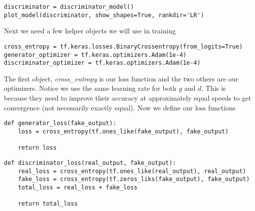 \documentclass[%
oneside,                 %
final,                   %
10pt]{article}
\begin{document}
\begin{verbatim}
discriminator = discriminator_model()
plot_model(discriminator, show_shapes=True, rankdir='LR')

\end{verbatim}


Next we need a few helper objects we will use in training





\begin{verbatim}
cross_entropy = tf.keras.losses.BinaryCrossentropy(from_logits=True)
generator_optimizer = tf.keras.optimizers.Adam(1e-4)
discriminator_optimizer = tf.keras.optimizers.Adam(1e-4)

\end{verbatim}


The first object, \emph{cross_entropy} is our loss function and the two others are
our optimizers. Notice we use the same learning rate for both $g$ and $d$. This
is because they need to improve their accuracy at approximately equal speeds to
get convergence (not necessarily exactly equal). Now we define our loss
functions






\begin{verbatim}
def generator_loss(fake_output):
    loss = cross_entropy(tf.ones_like(fake_output), fake_output)

    return loss

\end{verbatim}









\begin{verbatim}
def discriminator_loss(real_output, fake_output):
    real_loss = cross_entropy(tf.ones_like(real_output), real_output)
    fake_loss = cross_entropy(tf.zeros_liks(fake_output), fake_output)
    total_loss = real_loss + fake_loss

    return total_loss

\end{verbatim}
\end{document}
